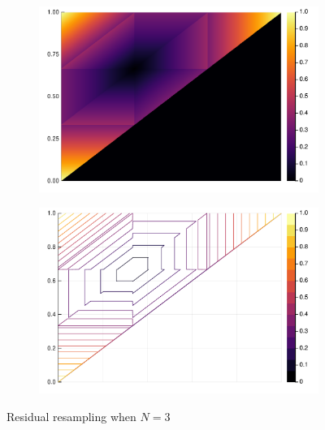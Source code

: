 \documentclass[fleqn]{article}
\theoremstyle{definition}
\begin{document}
\begin{figure}
	\begin{subfigure}{0.49\textwidth}
		\includegraphics[width=\textwidth]{plots/EcN_res_N3_heatmap.pdf}
	\end{subfigure}
	\hfill
	\begin{subfigure}{0.49\textwidth}
		\includegraphics[width=\textwidth]{plots/EcN_res_N3_contour.pdf}
	\end{subfigure}
	\caption{Residual resampling when $N=3$}
\end{figure}
\end{document}
